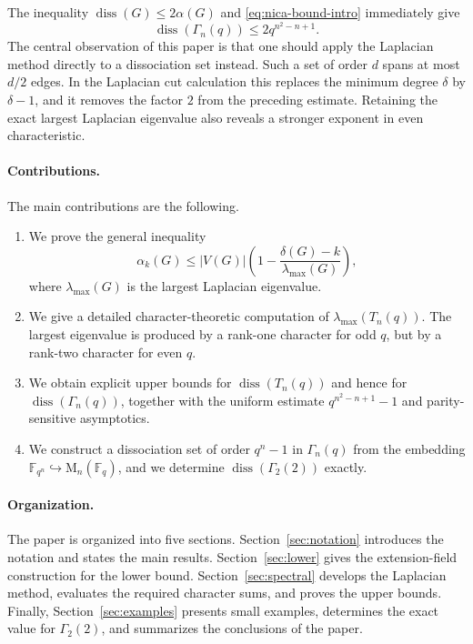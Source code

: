 \documentclass[11pt]{article}
\theoremstyle{definition}
\DeclareMathOperator{\diss}{diss}
\newcommand{\F}{\mathbb{F}}
\newcommand{\Mat}{\mathrm{M}}
\begin{document}
The inequality $\diss(G)\le2\alpha(G)$ and
\eqref{eq:nica-bound-intro} immediately give
\[
  \diss(\Gamma_n(q))\le2q^{n^2-n+1}.
\]
The central observation of this paper is that one should apply the
Laplacian method directly to a dissociation set instead.  Such a set of
order $d$ spans at most $d/2$ edges.  In the Laplacian cut calculation this
replaces the minimum degree $\delta$ by $\delta-1$, and it removes the
factor $2$ from the preceding estimate.  Retaining the exact largest
Laplacian eigenvalue also reveals a stronger exponent in even
characteristic.

\paragraph{Contributions.}
The main contributions are the following.
\begin{enumerate}
\item We prove the general inequality
\[
  \alpha_k(G)\le |V(G)|
  \left(1-\frac{\delta(G)-k}{\lambda_{\max}(G)}\right),
\]
where $\lambda_{\max}(G)$ is the largest Laplacian eigenvalue.
\item We give a detailed character-theoretic computation of
$\lambda_{\max}(T_n(q))$.  The largest eigenvalue is produced by a rank-one
character for odd $q$, but by a rank-two character for even $q$.
\item We obtain explicit upper bounds for $\diss(T_n(q))$ and hence for
$\diss(\Gamma_n(q))$, together with the uniform estimate
$q^{n^2-n+1}-1$ and parity-sensitive asymptotics.
\item We construct a dissociation set of order $q^n-1$ in
$\Gamma_n(q)$ from the embedding $\F_{q^n}\hookrightarrow\Mat_n(\F_q)$,
and we determine $\diss(\Gamma_2(2))$ exactly.
\end{enumerate}

\paragraph{Organization.}
The paper is organized into five sections.  Section~\ref{sec:notation}
introduces the notation and states the main results.  Section~\ref{sec:lower}
gives the extension-field construction for the lower bound.
Section~\ref{sec:spectral} develops the Laplacian method, evaluates the
required character sums, and proves the upper bounds.  Finally,
Section~\ref{sec:examples} presents small examples, determines the exact
value for $\Gamma_2(2)$, and summarizes the conclusions of the paper.
\end{document}
